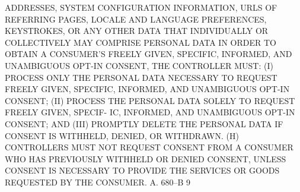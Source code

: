  ADDRESSES,  SYSTEM  CONFIGURATION  INFORMATION, URLS OF REFERRING PAGES,
 LOCALE AND LANGUAGE PREFERENCES, KEYSTROKES,  OR  ANY  OTHER  DATA  THAT
 INDIVIDUALLY  OR  COLLECTIVELY  MAY  COMPRISE  PERSONAL DATA IN ORDER TO
 OBTAIN A CONSUMER'S FREELY GIVEN, SPECIFIC,  INFORMED,  AND  UNAMBIGUOUS
 OPT-IN CONSENT, THE CONTROLLER MUST:
   (I)  PROCESS ONLY THE PERSONAL DATA NECESSARY TO REQUEST FREELY GIVEN,
 SPECIFIC, INFORMED, AND UNAMBIGUOUS OPT-IN CONSENT;
   (II) PROCESS THE PERSONAL DATA SOLELY TO REQUEST FREELY GIVEN, SPECIF-
 IC, INFORMED, AND UNAMBIGUOUS OPT-IN CONSENT; AND
   (III) PROMPTLY DELETE  THE  PERSONAL  DATA  IF  CONSENT  IS  WITHHELD,
 DENIED, OR WITHDRAWN.
   (H)  CONTROLLERS  MUST  NOT  REQUEST  CONSENT  FROM A CONSUMER WHO HAS
 PREVIOUSLY WITHHELD OR DENIED CONSENT, UNLESS CONSENT  IS  NECESSARY  TO
 PROVIDE THE SERVICES OR GOODS REQUESTED BY THE CONSUMER.
 A. 680--B                           9
 
